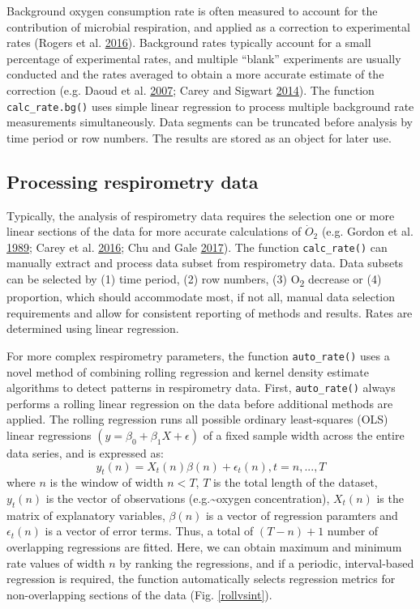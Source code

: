 \documentclass[a4paper,10pt, oneside]{memoir}
\begin{document}
Background oxygen consumption rate is often measured to account for the contribution of microbial respiration, and applied as a correction to experimental rates (Rogers et al. \protect\hyperlink{ref-Rogers2016}{2016}).
Background rates typically account for a small percentage of experimental rates, and multiple ``blank'' experiments are usually conducted and the rates averaged to obtain a more accurate estimate of the correction (e.g. Daoud et al. \protect\hyperlink{ref-Daoud2007}{2007}; Carey and Sigwart \protect\hyperlink{ref-Carey2014a}{2014}).
The function \texttt{calc\_rate.bg()} uses simple linear regression to process multiple background rate measurements simultaneously.
Data segments can be truncated before analysis by time period or row numbers. The results are stored as an object for later use.

\subsection{Processing respirometry data}\label{processing-respirometry-data}

Typically, the analysis of respirometry data requires the selection one or more linear sections of the data for more accurate calculations of \(\dot{O} \mathrm{_2}\) (e.g. Gordon et al. \protect\hyperlink{ref-Gordon1989}{1989}; Carey et al. \protect\hyperlink{ref-Carey2016}{2016}; Chu and Gale \protect\hyperlink{ref-Chu2017}{2017}).
The function \texttt{calc\_rate()} can manually extract and process data subset from respirometry data. Data subsets can be selected by (1) time period, (2) row numbers, (3) O\textsubscript{2} decrease or (4) proportion, which should accommodate most, if not all, manual data selection requirements and allow for consistent reporting of methods and results.
Rates are determined using linear regression.

For more complex respirometry parameters, the function \texttt{auto\_rate()} uses a novel method of combining rolling regression and kernel density estimate algorithms to detect patterns in respirometry data.
First, \texttt{auto\_rate()} always performs a rolling linear regression on the data before additional methods are applied.
The rolling regression runs all possible ordinary least-squares (OLS) linear regressions \((y=\beta_0+\beta_1X+\epsilon)\) of a fixed sample width across the entire data series, and is expressed as: \[y_t(n)=X_t(n)\beta(n)+\epsilon_t(n), t=n,...,T\] where \(n\) is the window of width \(n < T\), \(T\) is the total length of the dataset, \(y_t(n)\) is the vector of observations (e.g.\textasciitilde{}oxygen concentration), \(X_t(n)\) is the matrix of explanatory variables, \(\beta (n)\) is a vector of regression paramters and \(\epsilon_t(n)\) is a vector of error terms. Thus, a total of \((T - n) + 1\) number of overlapping regressions are fitted.
Here, we can obtain maximum and minimum rate values of width \(n\) by ranking the regressions, and if a periodic, interval-based regression is required, the function automatically selects regression metrics for non-overlapping sections of the data (Fig. \ref{rollvsint}).
\end{document}
